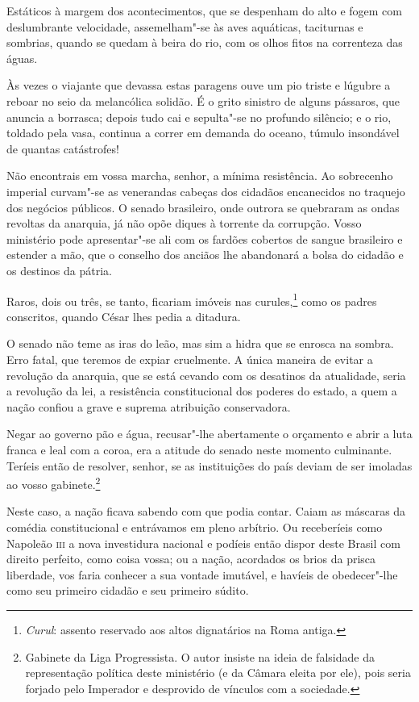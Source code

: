  Estáticos à margem dos acontecimentos, que se despenham do alto e fogem
com deslumbrante velocidade, assemelham"-se às aves aquáticas,
taciturnas e sombrias, quando se quedam à beira do rio, com os olhos
fitos na correnteza das águas. 

 Às vezes o viajante que devassa estas paragens ouve um pio triste e
lúgubre a reboar no seio da melancólica solidão. É o grito sinistro de
alguns pássaros, que anuncia a borrasca; depois tudo cai e sepulta"-se
no profundo silêncio; e o rio, toldado pela vasa, continua a correr em
demanda do oceano, túmulo insondável de quantas catástrofes!

 Não encontrais em vossa marcha, senhor, a mínima resistência. Ao
sobrecenho imperial curvam"-se as venerandas cabeças dos cidadãos
encanecidos no traquejo dos negócios públicos. O senado brasileiro,
onde outrora se quebraram as ondas revoltas da anarquia, já não opõe
diques à torrente da corrupção. Vosso ministério pode apresentar"-se
ali com os fardões cobertos de sangue brasileiro e estender a mão, que
o conselho dos anciãos lhe abandonará a bolsa do cidadão e os destinos da pátria.

 Raros, dois ou três, se tanto, ficariam imóveis nas
curules,\footnote{ \textit{Curul}: assento reservado aos altos dignatários na Roma antiga.}
 como os padres conscritos, quando César lhes pedia a ditadura. 

 O senado não teme as iras do leão, mas sim a hidra que se enrosca na
sombra. Erro fatal, que teremos de expiar cruelmente. A única maneira
de evitar a revolução da anarquia, que se está cevando com os desatinos
da atualidade, seria a revolução da lei, a resistência constitucional
dos poderes do estado, a quem a nação confiou a grave e suprema
atribuição conservadora. 

 Negar ao governo pão e água, recusar"-lhe abertamente o orçamento e
abrir a luta franca e leal com a coroa, era a atitude do senado neste
momento culminante. Teríeis então de resolver, senhor, se as
instituições do país deviam de ser imoladas ao vosso
gabinete.\footnote{ Gabinete da Liga Progressista. O autor insiste na ideia de falsidade da
representação política deste ministério (e da Câmara eleita por ele),
pois seria forjado pelo Imperador e desprovido de vínculos com a sociedade.}
 

 Neste caso, a nação ficava sabendo com que podia contar. Caiam as
máscaras da comédia constitucional e entrávamos em pleno arbítrio. Ou
receberíeis como Napoleão \textsc{iii} a nova investidura nacional e podíeis
então dispor deste Brasil com direito perfeito, como coisa vossa; ou a
nação, acordados os brios da prisca liberdade, vos faria conhecer a sua
vontade imutável, e havíeis de obedecer"-lhe como seu primeiro cidadão
e seu primeiro súdito. 

